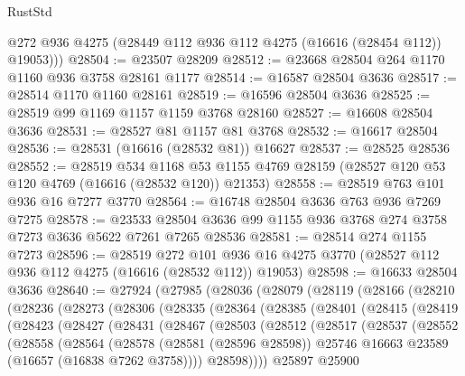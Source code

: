 \begin{lexlean}{RustStd}
\begin{coremodule}
        @272
        @936
        @4275
        (@28449 @112 @936 @112 @4275 (@16616 (@28454 @112)) @19053)))
@28504 := @23507 @28209
@28512 := @23668 @28504 @264 @1170 @1160 @936 @3758 @28161 @1177
@28514 := @16587 @28504 @3636
@28517 := @28514 @1170 @1160 @28161
@28519 := @16596 @28504 @3636
@28525 := @28519 @99 @1169 @1157 @1159 @3768 @28160
@28527 := @16608 @28504 @3636
@28531 := @28527 @81 @1157 @81 @3768
@28532 := @16617 @28504
@28536 := @28531 (@16616 (@28532 @81)) @16627
@28537 := @28525 @28536
@28552 := @28519
    @534
    @1168
    @53
    @1155
    @4769
    @28159
    (@28527 @120 @53 @120 @4769 (@16616 (@28532 @120)) @21353)
@28558 := @28519 @763 @101 @936 @16 @7277 @3770
@28564 := @16748 @28504 @3636 @763 @936 @7269 @7275
@28578 := @23533 @28504 @3636 @99 @1155 @936 @3768 @274 @3758 @7273 @3636 @5622 @7261 @7265 @28536
@28581 := @28514 @274 @1155 @7273
@28596 := @28519
    @272
    @101
    @936
    @16
    @4275
    @3770
    (@28527 @112 @936 @112 @4275 (@16616 (@28532 @112)) @19053)
@28598 := @16633 @28504 @3636
@28640 := @27924
    (@27985
      (@28036
        (@28079
          (@28119
            (@28166
              (@28210
                (@28236
                  (@28273
                    (@28306
                      (@28335
                        (@28364
                          (@28385
                            (@28401
                              (@28415
                                (@28419
                                  (@28423
                                    (@28427
                                      (@28431
                                        (@28467
                                          (@28503
                                            (@28512
                                              (@28517
                                                (@28537
                                                  (@28552
                                                    (@28558
                                                      (@28564
                                                        (@28578
                                                          (@28581 (@28596 @28598))
                                                          @25746
                                                          @16663
                                                          @23589
                                                          (@16657 (@16838 @7262 @3758))))
                                                      @28598))))
                                              @25897
                                              @25900

\end{coremodule}
\end{lexlean}

